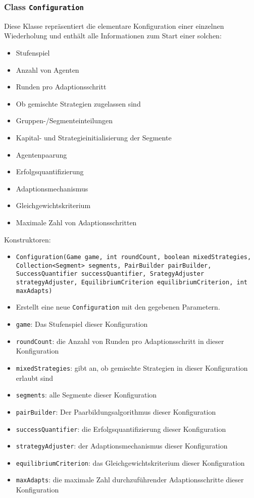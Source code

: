 \documentclass[parskip=full,11pt]{scrartcl}
\begin{document}
\subsubsection{Class \texttt{Configuration}}
Diese Klasse repräsentiert die elementare Konfiguration einer einzelnen Wiederholung und enthält alle Informationen zum Start einer solchen:
\begin{itemize}\itemsep -10pt
\item Stufenspiel
\item Anzahl von Agenten
\item Runden pro Adaptionsschritt
\item Ob gemischte Strategien zugelassen sind
\item Gruppen-/Segmenteinteilungen
\item Kapital- und Strategieinitialisierung der Segmente
\item Agentenpaarung
\item Erfolgsquantifizierung
\item Adaptionsmechanismus
\item Gleichgewichtskriterium
\item Maximale Zahl von Adaptionsschritten
\end{itemize}

Konstruktoren:
\begin{itemize}\itemsep -10pt
\item \texttt{Configuration(Game game, int roundCount, boolean mixedStrategies, Collection<Segment> segments, PairBuilder pairBuilder, SuccessQuantifier successQuantifier, SrategyAdjuster strategyAdjuster, EquilibriumCriterion equilibriumCriterion, int maxAdapts)}
\item[] Erstellt eine neue \texttt{Configuration} mit den gegebenen Parametern.
\item[] \texttt{game}: Das Stufenspiel dieser Konfiguration
\item[] \texttt{roundCount}: die Anzahl von Runden pro Adaptionsschritt in dieser Konfiguration
\item[] \texttt{mixedStrategies}: gibt an, ob gemischte Strategien in dieser Konfiguration erlaubt sind
\item[] \texttt{segments}: alle Segmente dieser Konfiguration
\item[] \texttt{pairBuilder}: Der Paarbildungsalgorithmus dieser Konfiguration
\item[] \texttt{successQuantifier}: die Erfolgsquantifizierung dieser Konfiguration
\item[] \texttt{strategyAdjuster}: der Adaptionsmechanismus dieser Konfiguration
\item[] \texttt{equilibriumCriterion}: das Gleichgewichtskriterium dieser Konfiguration
\item[] \texttt{maxAdapts}: die maximale Zahl durchzuführender Adaptionsschritte dieser Konfiguration
\end{itemize}
\end{document}
